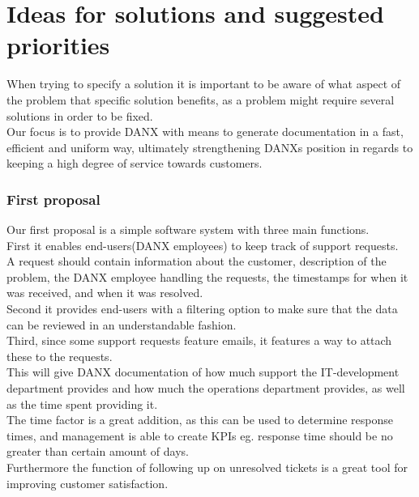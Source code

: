 \section{Ideas for solutions and suggested priorities}
\label{sec:ideas}
When trying to specify a solution it is important to be aware of what aspect of the problem that specific solution benefits, as a problem might require several solutions in order to be fixed.\\
Our focus is to provide DANX with means to generate documentation in a fast, efficient and uniform way, ultimately strengthening DANXs position in regards to keeping a high degree of service towards customers.\\

\subsubsection{First proposal}
Our first proposal is a simple software system with three main functions.\\
First it enables end-users(DANX employees) to keep track of support requests.\\
A request should contain information about the customer, description of the problem, the DANX employee handling the requests, the timestamps for when it was received, and when it was resolved.\\
Second it provides end-users with a filtering option to make sure that the data can be reviewed in an understandable fashion.\\
Third, since some support requests feature emails, it features a way to attach these to the requests.\\
This will give DANX documentation of how much support the IT-development department provides and how much the operations department provides, as well as the time spent providing it.\\
The time factor is a great addition, as this can be used to determine response times, and management is able to create KPIs eg. response time should be no greater than certain amount of days.\\
Furthermore the function of following up on unresolved tickets is a great tool for improving customer satisfaction.\\

